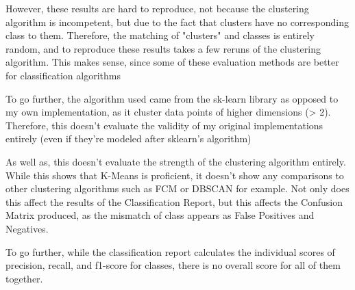 \documentclass[10pt,twocolumn]{article}
\begin{document}
However, these results are hard to reproduce, not because the clustering algorithm is incompetent, but due to the fact that clusters have no corresponding class to them. Therefore, the matching of "clusters" and classes is entirely random, and to reproduce these results takes a few reruns of the clustering algorithm. This makes sense, since some of these evaluation methods are better for classification algorithms

To go further, the algorithm used came from the sk-learn library as opposed to my own implementation, as it cluster data points of higher dimensions (> 2). Therefore, this doesn't evaluate the validity of my original implementations entirely (even if they're modeled after sklearn's algorithm)

As well as, this doesn't evaluate the strength of the clustering algorithm entirely. While this shows that K-Means is proficient, it doesn't show any comparisons to other clustering algorithms such as FCM or DBSCAN for example. Not only does this affect the results of the Classification Report, but this affects the Confusion Matrix produced, as the mismatch of class appears as False Positives and Negatives.

To go further, while the classification report calculates the individual scores of precision, recall, and f1-score for classes, there is no overall score for all of them together. 


\printbibliography
 
\end{document}
